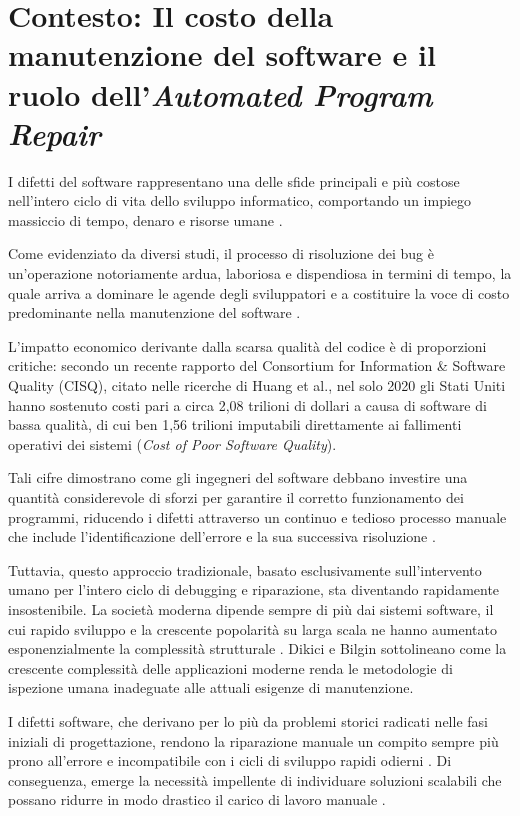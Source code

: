 \section{Contesto: Il costo della manutenzione del software e il ruolo dell'\textit{Automated Program Repair}}

I difetti del software rappresentano una delle sfide principali e più costose nell'intero ciclo di vita dello sviluppo informatico, 
comportando un impiego massiccio di tempo, denaro e risorse umane \cite{le2016towards}.

Come evidenziato da diversi studi, il processo di risoluzione dei bug  è un'operazione notoriamente ardua, laboriosa e 
dispendiosa in termini di tempo, la quale arriva a dominare le agende degli sviluppatori e a costituire la voce di costo predominante 
nella manutenzione del software \cite{le2016towards}.

L'impatto economico derivante dalla scarsa qualità del codice è di proporzioni critiche: secondo un recente rapporto del Consortium 
for Information \& Software Quality (CISQ), citato nelle ricerche di Huang et al., nel solo 2020 gli Stati Uniti hanno sostenuto costi 
pari a circa 2,08 trilioni di dollari a causa di software di bassa qualità, di cui ben 1,56 trilioni imputabili direttamente ai fallimenti 
operativi dei sistemi (\textit{Cost of Poor Software Quality}).

Tali cifre dimostrano come gli ingegneri del software debbano investire una quantità considerevole di sforzi per garantire il corretto 
funzionamento dei programmi, riducendo i difetti attraverso un continuo e tedioso processo manuale che include l'identificazione 
dell'errore  e la sua successiva risoluzione  \cite{huang2022survey}.

Tuttavia, questo approccio tradizionale, basato esclusivamente sull'intervento umano per l'intero ciclo di debugging e riparazione, 
sta diventando rapidamente insostenibile. La società moderna dipende sempre di più dai sistemi software, il cui rapido sviluppo e la crescente 
popolarità su larga scala ne hanno aumentato esponenzialmente la complessità strutturale \cite{huang2024evolving}.
Dikici e Bilgin sottolineano come la crescente complessità delle applicazioni moderne renda le metodologie di ispezione umana inadeguate alle attuali esigenze di manutenzione.

I difetti software, che derivano per lo più da problemi storici radicati nelle fasi iniziali di progettazione, rendono la riparazione manuale
un compito sempre più prono all'errore e incompatibile con i cicli di sviluppo rapidi odierni \cite{huang2024evolving,dikici2025advancements}.
Di conseguenza, emerge la necessità impellente di individuare soluzioni scalabili che possano ridurre in modo drastico il carico di lavoro manuale \cite{le2016towards}.


